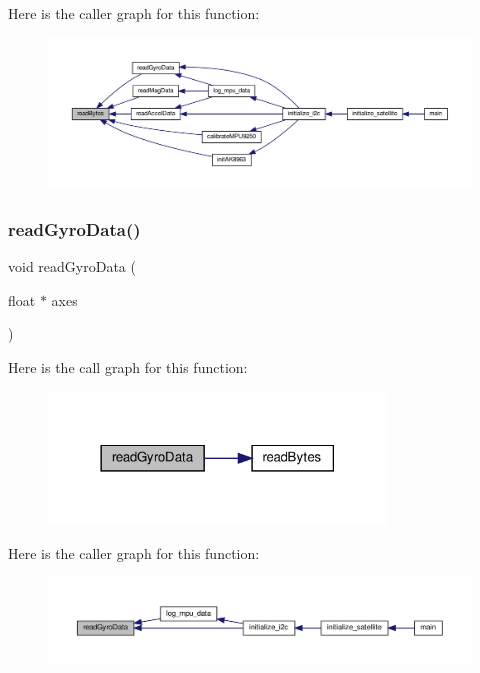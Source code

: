 Here is the caller graph for this function\+:\nopagebreak
\begin{figure}[H]
\begin{center}
\leavevmode
\includegraphics[width=350pt]{i2c-interface_8c_acc553fa90ebff27c5f1d36e44160c181_icgraph}
\end{center}
\end{figure}
\mbox{\label{i2c-interface_8c_abeec5582b16c259bda23acaebc77cc3b}} 
\subsubsection{\texorpdfstring{read\+Gyro\+Data()}{readGyroData()}}
{\footnotesize\ttfamily void read\+Gyro\+Data (\begin{DoxyParamCaption}\item[{float $\ast$}]{axes }\end{DoxyParamCaption})}

Here is the call graph for this function\+:\nopagebreak
\begin{figure}[H]
\begin{center}
\leavevmode
\includegraphics[width=254pt]{i2c-interface_8c_abeec5582b16c259bda23acaebc77cc3b_cgraph}
\end{center}
\end{figure}
Here is the caller graph for this function\+:\nopagebreak
\begin{figure}[H]
\begin{center}
\leavevmode
\includegraphics[width=350pt]{i2c-interface_8c_abeec5582b16c259bda23acaebc77cc3b_icgraph}
\end{center}
\end{figure}
\mbox{\label{i2c-interface_8c_a121c45c907088a8dcb84c0d72ded4f2b}} 
